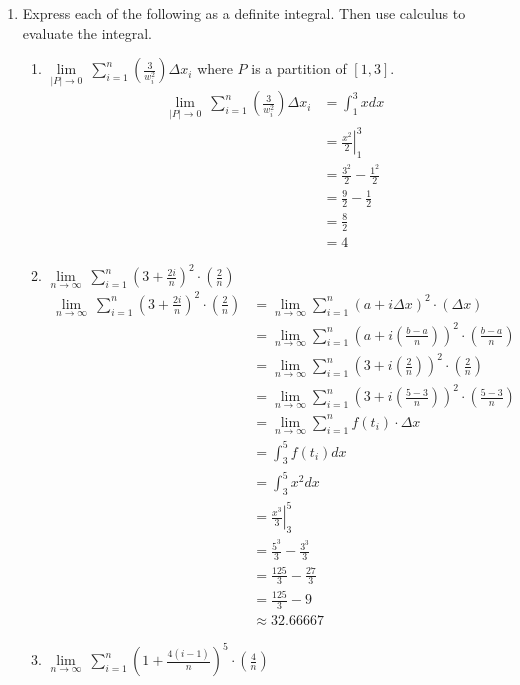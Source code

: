 \documentclass[12pt,letterpaper]{article}
\theoremstyle{case}
\theoremstyle{definition}
\begin{document}
\begin{enumerate}
		\item Express each of the following as a definite integral. Then use calculus to evaluate the integral.
		\begin{enumerate}
			\item $\lim\limits_{|P| \to 0}\ \sum\limits_{i=1}^{n} \left(\frac{3}{w_i^2}\right) \Delta x_i$ where $P$ is a partition of $[1,3]$.
			\begin{align*}
				\lim\limits_{|P| \to 0}\ \sum\limits_{i=1}^{n} \left(\frac{3}{w_i^2}\right) \Delta x_i &= \int_{1}^{3} x dx \\
				&= \left.\frac{x^2}{2} \right|_1^3 \\
				&= \frac{3^2}{2} - \frac{1^2}{2} \\
				&= \frac{9}{2} - \frac{1}{2} \\
				&= \frac{8}{2} \\
				&= 4
			\end{align*}
			\item $\lim\limits_{n \to \infty}\ \sum\limits_{i=1}^{n} \left(3 + \frac{2i}{n}\right)^2\cdot \left(\frac{2}{n}\right)$
			\begin{align*}
				\lim\limits_{n \to \infty}\ \sum\limits_{i=1}^{n} \left(3 + \frac{2i}{n}\right)^2\cdot \left(\frac{2}{n}\right) &= \lim\limits_{n \to \infty} \sum_{i=1}^{n} \left(a+i\Delta x\right)^2\cdot \left(\Delta x\right) \\
				&= \lim\limits_{n \to \infty} \sum_{i=1}^{n} \left(a+i\left(\frac{b-a}{n}\right)\right)^2 \cdot \left(\frac{b-a}{n}\right) \\
				&= \lim\limits_{n \to \infty} \sum_{i=1}^{n} \left(3+i\left(\frac{2}{n}\right)\right)^2 \cdot \left(\frac{2}{n}\right) \\
				&= \lim\limits_{n \to \infty} \sum_{i=1}^{n} \left(3+i\left(\frac{5-3}{n}\right)\right)^2\cdot \left(\frac{5-3}{n}\right) \\
				&= \lim\limits_{n \to \infty} \sum_{i=1}^{n} f(t_i)\cdot \Delta x \\
				&= \int_{3}^{5} f(t_i) dx \\
				&= \int_{3}^{5} x^2 dx \\
				&= \left. \frac{x^3}{3} \right|_{3}^{5} \\
				&= \frac{5^3}{3}-\frac{3^3}{3} \\
				&= \frac{125}{3} - \frac{27}{3} \\
				&= \frac{125}{3} - 9 \\
				&\approx 32.66667
			\end{align*}
			\item $\lim\limits_{n \to \infty}\ \sum\limits_{i=1}^{n} \left(1 + \frac{4(i-1)}{n}\right)^5\cdot \left(\frac{4}{n}\right)$

\end{enumerate}
\end{enumerate}
\end{document}
